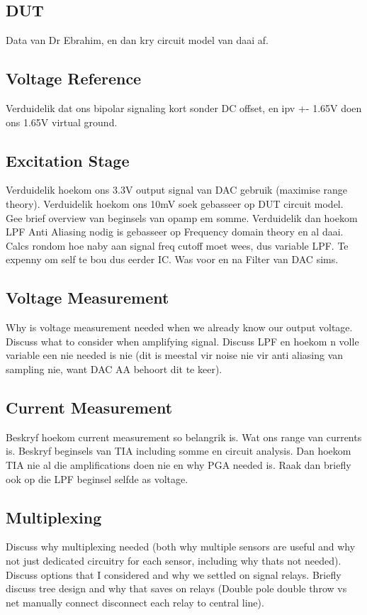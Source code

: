 \subsection{DUT}
Data van Dr Ebrahim, en dan kry circuit model van daai af.

\subsection{Voltage Reference}
Verduidelik dat ons bipolar signaling kort sonder DC offset, en ipv +- 1.65V doen ons 1.65V virtual ground.

\subsection{Excitation Stage}
Verduidelik hoekom ons 3.3V output signal van DAC gebruik (maximise range theory). Verduidelik hoekom ons 10mV soek gebasseer op DUT circuit model. Gee brief overview van beginsels van opamp em somme. Verduidelik dan hoekom LPF Anti Aliasing nodig is gebasseer op Frequency domain theory en al daai. Calcs rondom hoe naby aan signal freq cutoff moet wees, dus variable LPF. Te expenny om self te bou dus eerder IC. Was voor en na Filter van DAC sims.

\subsection{Voltage Measurement}
Why is voltage measurement needed when we already know our output voltage. Discuss what to consider when amplifying signal. Discuss LPF en hoekom n volle variable een nie needed is nie (dit is meestal vir noise nie vir anti aliasing van sampling nie, want DAC AA behoort dit te keer).

\subsection{Current Measurement}
Beskryf hoekom current measurement so belangrik is. Wat ons range van currents is. Beskryf beginsels van TIA including somme en circuit analysis. Dan hoekom TIA nie al die amplifications doen nie en why PGA needed is. Raak dan briefly ook op die LPF beginsel selfde as voltage.

\subsection{Multiplexing}
Discuss why multiplexing needed (both why multiple sensors are useful and why not just dedicated circuitry for each sensor, including why thats not needed). Discuss options that I considered and why we settled on signal relays. Briefly discuss tree design and why that saves on relays (Double pole double throw vs net manually connect disconnect each relay to central line).

